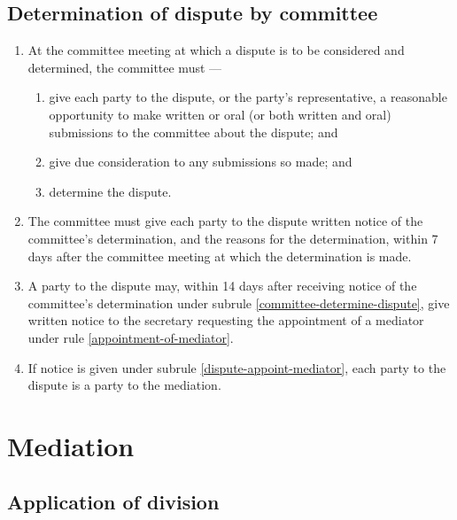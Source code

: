 \documentclass[../constitution.tex]{subfiles}
\begin{document}
\hypertarget{determination-of-dispute-by-committee}{%
\subsection{Determination of dispute by committee}\label{determination-of-dispute-by-committee}}

\begin{enumerate}

\item At the committee meeting at which a dispute is to be considered and determined, the committee must ---

  \begin{enumerate}
  
  \item give each party to the dispute, or the party's representative, a reasonable opportunity to make written or oral (or both written and oral) submissions to the committee about the dispute; and
  \item give due consideration to any submissions so made; and
  \item determine the dispute. \label{committee-determine-dispute}
  \end{enumerate}
\item The committee must give each party to the dispute written notice of the committee's determination, and the reasons for the determination, within 7 days after the committee meeting at which the determination is made.
\item A party to the dispute may, within 14 days after receiving notice of the committee's determination under subrule \ref{committee-determine-dispute}, give written notice to the secretary requesting the appointment of a mediator under rule \ref{appointment-of-mediator}. \label{dispute-appoint-mediator}
\item If notice is given under subrule \ref{dispute-appoint-mediator}, each party to the dispute is a party to the mediation.
\end{enumerate}

\hypertarget{division-4-mediation}{%
\section{Mediation}\label{division-4-mediation}}

\hypertarget{application-of-division-mediation}{%
\subsection{Application of division}\label{application-of-division-mediation}}
\end{document}
